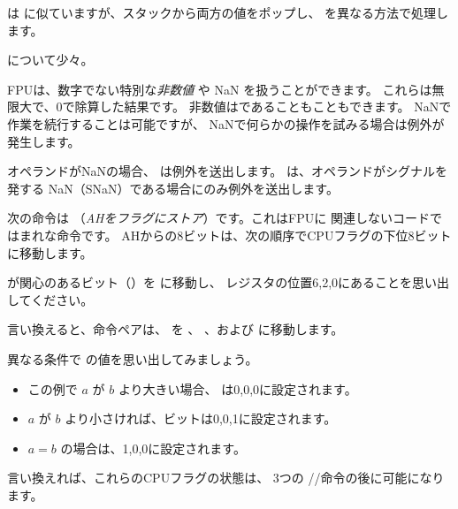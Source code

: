 ﻿




\FUCOMPP{} は \FCOM に似ていますが、スタックから両方の値をポップし、
 を異なる方法で処理します。

 について少々。

FPUは、数字でない特別な\emph{非数値} や \gls{NaN} を扱うことができます。 
これらは無限大で、0で除算した結果です。
非数値はであることもこともできます。 NaNで
作業を続行することは可能ですが、 NaNで何らかの操作を試みる場合は例外が発生します。


オペランドが\gls{NaN}の場合、 \FCOM は例外を送出します。 
\FUCOM は、オペランドがシグナルを発する \gls{NaN}（SNaN）である場合にのみ例外を送出します。

\label{SAHF}

次の命令は \SAHF （\emph{AHをフラグにストア}）です。これはFPUに
関連しないコードではまれな命令です。
AHからの8ビットは、次の順序でCPUフラグの下位8ビットに移動します。




\FNSTSW が関心のあるビット（\CThreeBits）を \AH に移動し、
\AH レジスタの位置6,2,0にあることを思い出してください。



言い換えると、命令ペアは、 \CThreeBits を \ZF 、 \PF 、および \CF に移動します。

異なる条件で \CThreeBits の値を思い出してみましょう。

\begin{itemize}
\item この例で $a$ が $b$ より大きい場合、 \CThreeBits は0,0,0に設定されます。
\item $a$ が $b$ より小さければ、ビットは0,0,1に設定されます。
\item $a=b$ の場合は、1,0,0に設定されます。
\end{itemize}

言い換えれば、これらのCPUフラグの状態は、
3つの \FUCOMPP/\FNSTSW/\SAHF 命令の後に可能になります。

